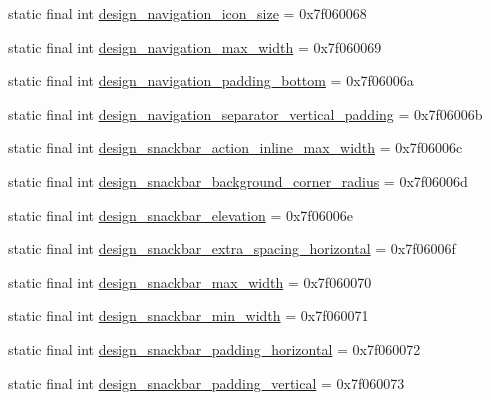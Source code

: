 \begin{DoxyCompactItemize}
\item 
static final int \mbox{\hyperlink{classandroid_1_1support_1_1design_1_1_r_1_1dimen_a09a0e74d4044391a347f715900c8ba05}{design\+\_\+navigation\+\_\+icon\+\_\+size}} = 0x7f060068
\item 
static final int \mbox{\hyperlink{classandroid_1_1support_1_1design_1_1_r_1_1dimen_aea61310378807a0bf7cf2f2a8a494681}{design\+\_\+navigation\+\_\+max\+\_\+width}} = 0x7f060069
\item 
static final int \mbox{\hyperlink{classandroid_1_1support_1_1design_1_1_r_1_1dimen_a2647e9da0be00a73db532944c5288a3a}{design\+\_\+navigation\+\_\+padding\+\_\+bottom}} = 0x7f06006a
\item 
static final int \mbox{\hyperlink{classandroid_1_1support_1_1design_1_1_r_1_1dimen_ad6a3bb1231788391e52c4896d0de39f7}{design\+\_\+navigation\+\_\+separator\+\_\+vertical\+\_\+padding}} = 0x7f06006b
\item 
static final int \mbox{\hyperlink{classandroid_1_1support_1_1design_1_1_r_1_1dimen_a6ec8da0fd7402fc33d6180aff7258f88}{design\+\_\+snackbar\+\_\+action\+\_\+inline\+\_\+max\+\_\+width}} = 0x7f06006c
\item 
static final int \mbox{\hyperlink{classandroid_1_1support_1_1design_1_1_r_1_1dimen_a469c963201807723e61ebd63d9d31b30}{design\+\_\+snackbar\+\_\+background\+\_\+corner\+\_\+radius}} = 0x7f06006d
\item 
static final int \mbox{\hyperlink{classandroid_1_1support_1_1design_1_1_r_1_1dimen_a618410f7930e7304fc24480e003f2f48}{design\+\_\+snackbar\+\_\+elevation}} = 0x7f06006e
\item 
static final int \mbox{\hyperlink{classandroid_1_1support_1_1design_1_1_r_1_1dimen_a9d7da239527c985b37edc815e1f67bd8}{design\+\_\+snackbar\+\_\+extra\+\_\+spacing\+\_\+horizontal}} = 0x7f06006f
\item 
static final int \mbox{\hyperlink{classandroid_1_1support_1_1design_1_1_r_1_1dimen_ae088decd1622475be59b157ddd788bb6}{design\+\_\+snackbar\+\_\+max\+\_\+width}} = 0x7f060070
\item 
static final int \mbox{\hyperlink{classandroid_1_1support_1_1design_1_1_r_1_1dimen_ad801c273260b6b31c3f8b25b24888e31}{design\+\_\+snackbar\+\_\+min\+\_\+width}} = 0x7f060071
\item 
static final int \mbox{\hyperlink{classandroid_1_1support_1_1design_1_1_r_1_1dimen_a009e67819dc08e09556179677e7d7209}{design\+\_\+snackbar\+\_\+padding\+\_\+horizontal}} = 0x7f060072
\item 
static final int \mbox{\hyperlink{classandroid_1_1support_1_1design_1_1_r_1_1dimen_a7fac1342910fbb66edd76b36ffb0040c}{design\+\_\+snackbar\+\_\+padding\+\_\+vertical}} = 0x7f060073

\end{DoxyCompactItemize}
